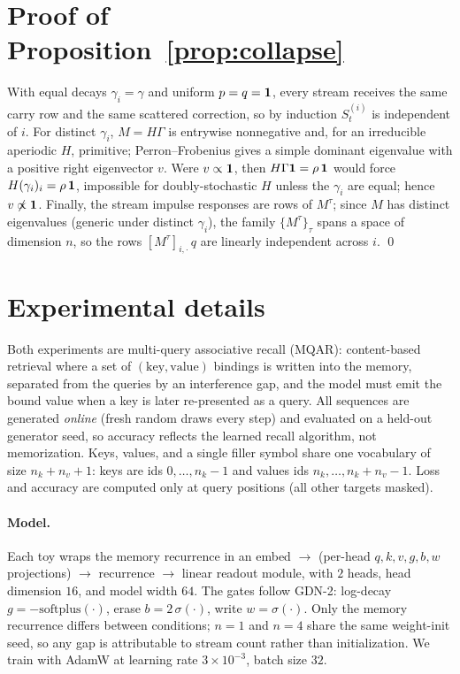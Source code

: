\documentclass[11pt,letterpaper,logo]{yalearxiv}
\begin{document}
\section{Proof of Proposition~\ref{prop:collapse}}
\label{app:collapse}

With equal decays $\gamma_i = \gamma$ and uniform $p = q = \mathbf 1$, every stream
receives the same carry row and the same scattered correction, so by induction
$S_t^{(i)}$ is independent of $i$. For distinct $\gamma_i$, $M = H\Gamma$ is
entrywise nonnegative and, for an irreducible aperiodic $H$, primitive;
Perron--Frobenius gives a simple dominant eigenvalue with a positive right
eigenvector $v$. Were $v \propto \mathbf 1$, then $H\Gamma\mathbf 1 = \rho\,\mathbf 1$ would
force $H(\gamma_i)_i = \rho\,\mathbf 1$, impossible for doubly-stochastic $H$ unless the
$\gamma_i$ are equal; hence $v \not\propto \mathbf 1$. Finally, the stream impulse
responses are rows of $M^\tau$; since $M$ has distinct eigenvalues (generic under
distinct $\gamma_i$), the family $\{M^\tau\}_\tau$ spans a space of dimension $n$,
so the rows $[M^\tau]_{i,\cdot}\,q$ are linearly independent across $i$. \qed

\section{Experimental details}
\label{app:mqar}

Both experiments are multi-query associative recall (MQAR): content-based
retrieval where a set of $(\text{key},\text{value})$ bindings is written into the
memory, separated from the queries by an interference gap, and the model must
emit the bound value when a key is later re-presented as a query. All sequences
are generated \emph{online} (fresh random draws every step) and evaluated on a
held-out generator seed, so accuracy reflects the learned recall algorithm, not
memorization. Keys, values, and a single filler symbol share one vocabulary of
size $n_k + n_v + 1$: keys are ids $0,\dots,n_k-1$ and values ids
$n_k,\dots,n_k+n_v-1$. Loss and accuracy are computed only at query positions
(all other targets masked).

\paragraph{Model.} Each toy wraps the memory recurrence in an
embed $\to$ (per-head $q,k,v,g,b,w$ projections) $\to$ recurrence $\to$ linear
readout module, with $2$ heads, head dimension $16$, and model width $64$. The
gates follow GDN-2: log-decay $g = -\mathrm{softplus}(\cdot)$, erase
$b = 2\,\sigma(\cdot)$, write $w = \sigma(\cdot)$. Only the memory recurrence
differs between conditions; $n{=}1$ and $n{=}4$ share the same weight-init seed,
so any gap is attributable to stream count rather than initialization. We train
with AdamW at learning rate $3\times10^{-3}$, batch size $32$.
\end{document}
